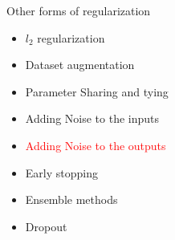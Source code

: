 \begin{frame}
\end{frame}

\begin{frame}
	\vspace{4em}
	\begin{overlayarea}{\textwidth}{\textheight}
		\begin{block}{Other forms of regularization}
			\begin{itemize}
				\item $l_2$ regularization
				\item Dataset augmentation
				\item Parameter Sharing and tying
				\item Adding Noise to the inputs
				\item \textcolor<1->{red}{Adding Noise to the outputs}
				\item Early stopping
				\item Ensemble methods
				\item Dropout
			\end{itemize}
		\end{block}
	\end{overlayarea}
\end{frame}
			
